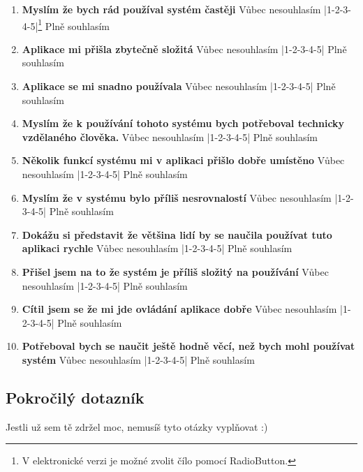 \begin{enumerate}
\item \textbf{Myslím že bych rád používal systém častěji} \newline
		Vůbec nesouhlasím |1-2-3-4-5|\footnote{V elektronické verzi je možné zvolit čílo pomocí RadioButton.} Plně souhlasím
\item \textbf{Aplikace mi přišla zbytečně složitá} \newline
		Vůbec nesouhlasím |1-2-3-4-5| Plně souhlasím
\item \textbf{Aplikace se mi snadno používala} \newline
		Vůbec nesouhlasím |1-2-3-4-5| Plně souhlasím
\item \textbf{Myslím že k používání tohoto systému bych potřeboval technicky vzdělaného člověka.} \newline
		Vůbec nesouhlasím |1-2-3-4-5| Plně souhlasím
\item \textbf{Několik funkcí systému mi v aplikaci přišlo dobře umístěno} \newline
		Vůbec nesouhlasím |1-2-3-4-5| Plně souhlasím
\item \textbf{Myslím že v systému bylo příliš nesrovnalostí} \newline
		Vůbec nesouhlasím |1-2-3-4-5| Plně souhlasím
\item \textbf{Dokážu si představit že většina lidí by se naučila používat tuto aplikaci rychle} \newline
		Vůbec nesouhlasím |1-2-3-4-5| Plně souhlasím
\item \textbf{Přišel jsem na to že systém je příliš složitý na používání} \newline
		Vůbec nesouhlasím |1-2-3-4-5| Plně souhlasím
\item \textbf{Cítil jsem se že mi jde ovládání aplikace dobře} \newline
		Vůbec nesouhlasím |1-2-3-4-5| Plně souhlasím
\item \textbf{Potřeboval bych se naučit ještě hodně věcí, než bych mohl používat systém} \newline
		Vůbec nesouhlasím |1-2-3-4-5| Plně souhlasím
\end{enumerate}

\subsection{Pokročilý dotazník}
Jestli už sem tě zdržel moc, nemusíš tyto otázky vyplňovat :)

